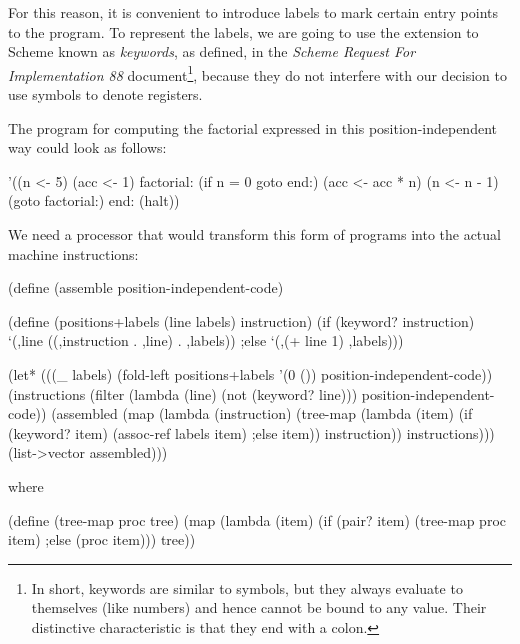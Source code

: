 For this reason, it is convenient to introduce labels to mark
certain entry points to the program. To represent the labels,
we are going to use the extension to Scheme known as \textit{keywords},
as defined, in the \textit{Scheme Request For Implementation 88}\cite{SRFI-88}
document\footnote{
  In short, keywords are similar to symbols, but they always evaluate
  to themselves (like numbers) and hence cannot be bound to any value.
  Their distinctive characteristic is that they end with a colon.
}, because they do not interfere with our decision to use symbols
to denote registers.

The program for computing the factorial expressed in this position-independent
way could look as follows:

\begin{Snippet}
   '((n <- 5)
     (acc <- 1)
  factorial:
     (if n = 0 goto end:)
     (acc <- acc * n)
     (n <- n - 1)
     (goto factorial:)
  end:
     (halt))
\end{Snippet}

We need a processor that would transform this form of programs
into the actual machine instructions:

\begin{Snippet}
  (define (assemble position-independent-code)
\end{Snippet}
\begin{Snippet}
    (define (positions+labels (line labels) instruction)
      (if (keyword? instruction)
        `(,line ((,instruction . ,line) . ,labels))
      ;else
        `(,(+ line 1) ,labels)))
\end{Snippet}
\begin{Snippet}
    (let* (((_ labels) (fold-left positions+labels
		                  '(0 ())
			          position-independent-code))
           (instructions (filter (lambda (line)
                                   (not (keyword? line)))
                                 position-independent-code))
	   (assembled (map (lambda (instruction)
                             (tree-map (lambda (item)
                                         (if (keyword? item)
			                   (assoc-ref labels item)
                                         ;else
				           item))
                                       instruction))
                           instructions)))
      (list->vector assembled)))
\end{Snippet}

where

\begin{Snippet}
  (define (tree-map proc tree)
    (map (lambda (item)
	   (if (pair? item)
	       (tree-map proc item)
           ;else
               (proc item)))
         tree))
\end{Snippet}
